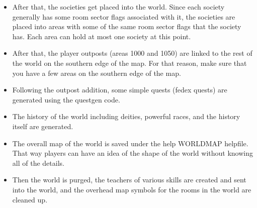 \begin{itemize}
\item After that, the societies get placed into the world. Since each 
society generally has some room sector flags associated with it,
the societies are placed into areas with some of the same
room sector flags that the society has. Each area can hold at most
one society at this point.

\item After that, the player outposts (areas 1000 and 1050) are 
linked to the rest of the world on the southern edge of the map. 
For that reason, make sure that you have a few areas on the
southern edge of the map.

\item Following the outpost addition, some simple quests (fedex quests)
are generated using the questgen code.

\item The history of the world including deities, powerful races, and the
  history itself are generated.

\item The overall map of the world is saved under the help WORLDMAP
  helpfile. That way players can have an idea of the shape of the world
  without knowing all of the details.

\item Then the world is purged, the teachers of various skills are
  created and sent into the world, and the overhead map symbols for the
rooms in the world are cleaned up.

\end{itemize}
